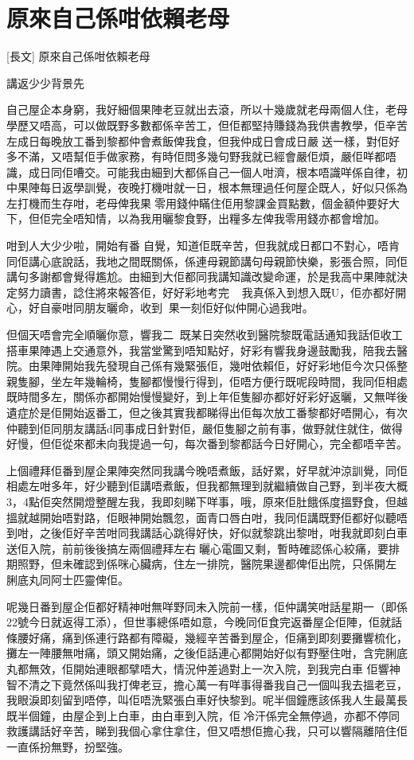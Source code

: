 \chapter{原來自己係咁依賴老母}

[長文] 原來自己係咁依賴老母

講返少少背景先

自己屋企本身窮，我好細個果陣老豆就出去滾，所以十幾歲就老母兩個人住，老母學歷又唔高，可以做既野多數都係辛苦工，但佢都堅持賺錢為我供書教學，佢辛苦左成日每晚放工番到黎都仲會煮飯俾我食，但我仲成日會成日嚴送一樣，對佢好多不滿，又唔幫佢手做家務，有時佢問多幾句野我就已經會嚴佢煩，嚴佢咩都唔識，成日同佢嘈交。可能我由細到大都係自己一個人咁濟，根本唔識咩係自律，初中果陣每日返學訓覺，夜晚打機咁就一日，根本無理過任何屋企既人，好似只係為左打機而生存咁，老母俾我果零用錢仲瞞住佢用黎課金買點數，個金額仲要好大下，但佢完全唔知情，以為我用曬黎食野，出糧多左俾我零用錢亦都會增加。

咁到人大少少啦，開始有番自覺，知道佢既辛苦，但我就成日都口不對心，唔肯同佢講心底說話，我地之間既關係，係連母親節講句母親節快樂，影張合照，同佢講句多謝都會覺得尷尬。由細到大佢都同我講知識改變命運，於是我高中果陣就決定努力讀書，諗住將來報答佢，好好彩地考完，我真係入到想入既U，佢亦都好開心，好自豪咁同朋友曬命，收到果一刻佢好似仲開心過我咁。

但個天唔會完全順曬你意，響我二󲆱既某日突然收到醫院黎既電話通知我話佢收工搭車果陣遇上交通意外，我當堂驚到唔知點好，好彩有響我身邊鼓勵我，陪我去醫院。由果陣開始我先發現自己係有幾緊張佢，幾咁依賴佢，好好彩地佢今次只係整親隻腳，坐左年幾輪椅，隻腳都慢慢行得到，佢唔方便行既呢段時間，我同佢相處既時間多左，關係亦都開始慢慢變好，到上年佢隻腳亦都好好彩好返曬，又無咩後遺症於是佢開始返番工，但之後其實我都睇得出佢每次放工番黎都好唔開心，有次仲聽到佢同朋友講話d同事成日針對佢，嚴佢隻腳之前有事，做野就住就住，做得好慢，但佢從來都未向我提過一句，每次番到黎都話今日好開心，完全都唔辛苦。

上個禮拜佢番到屋企果陣突然同我講今晚唔煮飯，話好累，好早就沖涼訓覺，同佢相處左咁多年，好少聽到佢講唔煮飯，但我都無理到就繼續做自己野，到半夜大概3，4點佢突然開燈整醒左我，我即刻睇下咩事，哦，原來佢肚餓係度搵野食，但越搵就越開始唔對路，佢眼神開始飄忽，面青口唇白咁，我同佢講既野佢都好似聽唔到咁，之後佢好辛苦咁同我講話心跳得好快，好似就黎跳出黎咁，咁我就即刻白車送佢入院，前前後後搞左兩個禮拜左右曬心電圖又剩，暫時確認係心絞痛，要排期照野，但未確認到係咪心臟病，住左一排院，醫院果邊都俾佢出院，只係開左脷底丸同阿士匹靈俾佢。

呢幾日番到屋企佢都好精神咁無咩野同未入院前一樣，佢仲講笑咁話星期一（即係22號今日就返得工添），但世事總係唔如意，今晚同佢食完返番屋企佢陣，佢就話條腰好痛，痛到係連行路都有障礙，幾經辛苦番到屋企，佢痛到即刻要攤響梳化，攤左一陣腰無咁痛，頭又開始痛，之後佢話連心都開始好似有野壓住咁，含完脷底丸都無效，佢開始連眼都擘唔大，情況仲差過對上一次入院，到我完白車 佢響神智不清之下竟然係叫我打俾老豆，擔心萬一有咩事得番我自己一個叫我去搵老豆，我眼淚即刻留到唔停，叫佢唔洗緊張白車好快黎到。呢半個鐘應該係我人生最萬長既半個鐘，由屋企到上白車，由白車到入院，佢冷汗係完全無停過，亦都不停同救護講話好辛苦，睇到我個心拿住拿住，但又唔想佢擔心我，只可以響隔離陪住佢一直係扮無野，扮堅強。

